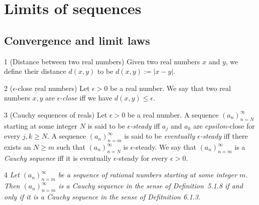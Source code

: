 \section{Limits of sequences}\label{a1-ch6}
\subsection{Convergence and limit laws}
\begin{definition}{1}
    \label{real-distance}
    (Distance between two real numbers) Given two real numbers $x$ and $y$, we
    define their distance $d(x, y)$ to be $d(x, y) := |x - y|$.
\end{definition}

\begin{definition}{2}
    \label{real-eps-close}
    ($\epsilon$-close real numbers) Let $\epsilon > 0$ be a real number. We say that
    two real numbers $x, y$ are \emph{$\epsilon$-close} iff we have $d(x, y) \leq \epsilon$.
\end{definition}

\begin{definition}{3}
    \label{real-cauchy-sequence}
    (Cauchy sequences of reals) Let $\epsilon > 0$ be a real number. A sequence
    $(a_n)_{n=N}^{\infty}$ starting at some integer $N$ is said to be \emph{$\epsilon$-steady}
    iff $a_j$ and $a_k$ are $epsilon$-close for every $j, k \geq N$. A sequence
    $(a_n)_{n=m}^{\infty}$ is said to be \emph{eventually $\epsilon$-steady} iff
    there exists an $N \geq m$ such that $(a_n)_{n=N}^{\infty}$ is $\epsilon$-steady.
    We say that $(a_n)_{n=m}^{\infty}$ is a \emph{Cauchy sequence} iff it is
    eventually $\epsilon$-steady for every $\epsilon > 0$.
\end{definition}

\begin{proposition}{4}
    \label{rat-cauchy-iff-real-cauchy}
    \emph{Let $(a_n)_{n=m}^{\infty}$ be a sequence of rational numbers starting
    at some integer $m$. Then $(a_n)_{n=m}^{\infty}$ is a Cauchy sequence in the
    sense of Definition~5.1.8 if and only if it is a Cauchy sequence in the sense
    of Defitnition 6.1.3.}
\end{proposition}

